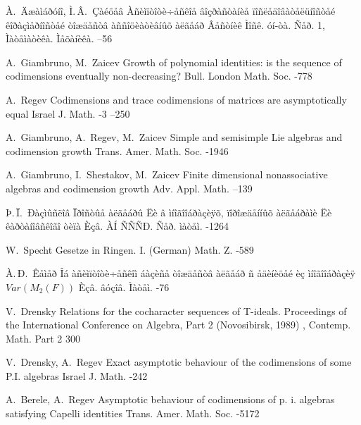 \documentclass{article}
\numberwithin{equation}{section}
\theoremstyle{plain}
\theoremstyle{definition}
\begin{document}
\begin{thebibliography}{99}

\by À.~Äæàìáðóíî, Ì.\,Â.~Çàéöåâ
\paper Àñèìïòîòè÷åñêîå âîçðàñòàíèå ïîñëåäîâàòåëüíîñòåé êîðàçìåðíîñòåé òîæäåñòâ àññîöèàòèâíûõ àëãåáð
\jour  Âåñòíèê Ìîñê. óí-òà. Ñåð. 1, Ìàòåìàòèêà. Ìåõàíèêà.
--56

\by A.~Giambruno, M.~Zaicev
\paper Growth of polynomial identities: is the sequence of codimensions eventually 
non-decreasing?
\jour Bull. London Math. Soc.
-778

\by A.~Regev
\paper Codimensions and trace codimensions of matrices are asymptotically equal
\jour Israel J. Math.
-3
--250

\by A.~Giambruno, A.~Regev,  M.~Zaicev
\paper Simple and semisimple Lie algebras and codimension growth
\jour Trans. Amer. Math. Soc.
-1946

\by A.~Giambruno, I.~Shestakov, M.~Zaicev
\paper Finite dimensional nonassociative algebras and codimension growth
\jour Adv. Appl. Math.
--139

\by Þ.\,Ï.~Ðàçìûñëîâ
\paper Ïðîñòûå àëãåáðû Ëè â ìíîãîîáðàçèÿõ, ïîðîæäåííûõ àëãåáðàìè Ëè êàðòàíîâñêîãî òèïà
\jour Èçâ. ÀÍ ÑÑÑÐ. Ñåð. ìàòåì.
-1264

\by W.~Specht
\paper Gesetze in Ringen. I. (German) 
\jour Math. Z. 
-589

\by À.\,Ð.~Êåìåð
\paper Îá àñèìïòîòè÷åñêîì áàçèñå òîæäåñòâ àëãåáð ñ åäèíèöåé èç ìíîãîîáðàçèÿ $Var(M_2(F))$
\jour Èçâ. âóçîâ. Ìàòåì.
-76

\by V.~Drensky
\paper  Relations for the cocharacter sequences of T-ideals. 
Proceedings of the International Conference on Algebra, Part 2 
 (Novosibirsk, 1989)
\jour , Contemp. Math.
\issue Part 2
300

 
 
 

\by V.~Drensky, A.~Regev
\paper Exact asymptotic behaviour of the codimensions of some P.I. algebras
\jour Israel J. Math.
-242

\by A.~Berele, A.~Regev
\paper Asymptotic behaviour of codimensions of p. i. algebras satisfying Capelli identities
\jour Trans. Amer. Math. Soc.
-5172


\end{thebibliography}
\end{document}
